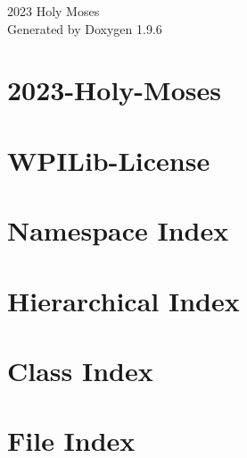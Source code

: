\documentclass[twoside]{book}
\newcommand{\+}{\discretionary{\mbox{\scriptsize$\hookleftarrow$}}{}{}}
\newcommand{\clearemptydoublepage}{%
    \newpage{\pagestyle{empty}\cleardoublepage}%
  }
\begin{document}
  \raggedbottom
    \hypersetup{pageanchor=false,
                bookmarksnumbered=true,
                pdfencoding=unicode
               }
  \begin{titlepage}
  \vspace*{7cm}
  \begin{center}%
  {\Large 2023 Holy Moses}\\
  \vspace*{1cm}
  {\large Generated by Doxygen 1.9.6}\\
  \end{center}
  \end{titlepage}
  \clearemptydoublepage
  \tableofcontents
  \clearemptydoublepage
  \hypersetup{pageanchor=true}
\chapter{2023-\/Holy-\/\+Moses}
\label{md__c___users__shelby__howell__documents__github_2023_project_0_1__r_e_a_d_m_e}

\chapter{WPILib-\/\+License}
\label{md__c___users__shelby__howell__documents__github_2023_project_0_1__w_p_i_lib__license}

\chapter{Namespace Index}

\chapter{Hierarchical Index}

\chapter{Class Index}

\chapter{File Index}

\end{document}

